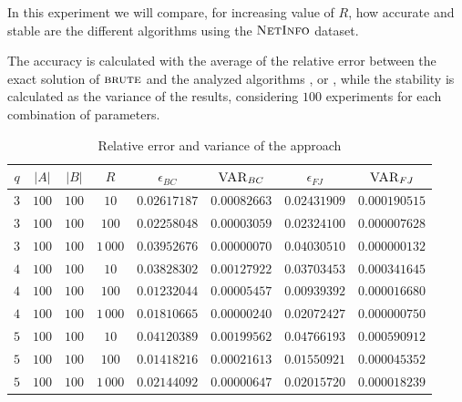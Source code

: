 In this experiment we will compare, for increasing value of $R$, how accurate and stable are the different algorithms using the $\textsc{NetInfo}$ dataset.\medskip

The accuracy is calculated with the average of the relative error between the exact solution of $\textsc{brute}$ and the analyzed algorithms \fcount, \fsamp or \base, while the stability is calculated as the variance of the results, considering $100$ experiments for each combination of parameters.

\begin{table}[h]
	\centering
	\begin{tabular}{|c|c|c|c|c|c|c|c|}
		\hline
		$q$ & $|A|$ & $|B|$ & $R$      & $\epsilon_{BC}$ & $\textsc{VAR}_{BC}$ & $\epsilon_{FJ}$ & $\textsc{VAR}_{FJ}$ \\ \hline \hline
		$3$ & $100$ & $100$ & $10$     & $0.02617187$    & $0.00082663$        & $0.02431909$    & $0.000190515$       \\ \hline
		$3$ & $100$ & $100$ & $100$    & $0.02258048$    & $0.00003059$        & $0.02324100$    & $0.000007628$       \\ \hline
		$3$ & $100$ & $100$ & $1\,000$ & $0.03952676$    & $0.00000070$        & $0.04030510$    & $0.000000132$       \\ \hline \hline
		$4$ & $100$ & $100$ & $10$     & $0.03828302$    & $0.00127922$        & $0.03703453$    & $0.000341645$       \\ \hline
		$4$ & $100$ & $100$ & $100$    & $0.01232044$    & $0.00005457$        & $0.00939392$    & $0.000016680$       \\ \hline
		$4$ & $100$ & $100$ & $1\,000$ & $0.01810665$    & $0.00000240$        & $0.02072427$    & $0.000000750$       \\ \hline \hline
		$5$ & $100$ & $100$ & $10$     & $0.04120389$    & $0.00199562$        & $0.04766193$    & $0.000590912$       \\ \hline
		$5$ & $100$ & $100$ & $100$    & $0.01418216$    & $0.00021613$        & $0.01550921$    & $0.000045352$       \\ \hline
		$5$ & $100$ & $100$ & $1\,000$ & $0.02144092$    & $0.00000647$        & $0.02015720$    & $0.000018239$       \\ \hline
		
	\end{tabular}
	\caption{Relative error and variance of the \fcount approach}	
\end{table}

